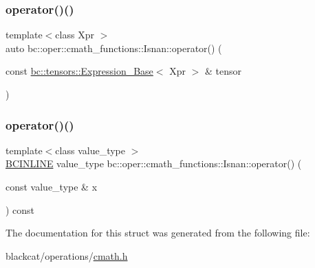 \mbox{\label{structbc_1_1oper_1_1cmath__functions_1_1Isnan_a904a87a5d5700019a8cd54c513e333c5}} 
\subsubsection{\texorpdfstring{operator()()}{operator()()}\hspace{0.1cm}{\footnotesize\ttfamily [2/3]}}
{\footnotesize\ttfamily template$<$class Xpr $>$ \\
auto bc\+::oper\+::cmath\+\_\+functions\+::\+Isnan\+::operator() (\begin{DoxyParamCaption}\item[{const \hyperlink{classbc_1_1tensors_1_1Expression__Base}{bc\+::tensors\+::\+Expression\+\_\+\+Base}$<$ Xpr $>$ \&}]{tensor }\end{DoxyParamCaption})\hspace{0.3cm}{\ttfamily [inline]}}

\mbox{\label{structbc_1_1oper_1_1cmath__functions_1_1Isnan_a3adb92aae01e1f19c5809a3431d4f7af}} 
\subsubsection{\texorpdfstring{operator()()}{operator()()}\hspace{0.1cm}{\footnotesize\ttfamily [3/3]}}
{\footnotesize\ttfamily template$<$class value\+\_\+type $>$ \\
\hyperlink{common_8h_a6699e8b0449da5c0fafb878e59c1d4b1}{B\+C\+I\+N\+L\+I\+NE} value\+\_\+type bc\+::oper\+::cmath\+\_\+functions\+::\+Isnan\+::operator() (\begin{DoxyParamCaption}\item[{const value\+\_\+type \&}]{x }\end{DoxyParamCaption}) const\hspace{0.3cm}{\ttfamily [inline]}}



The documentation for this struct was generated from the following file\+:\begin{DoxyCompactItemize}
\item 
blackcat/operations/\hyperlink{cmath_8h}{cmath.\+h}\end{DoxyCompactItemize}
